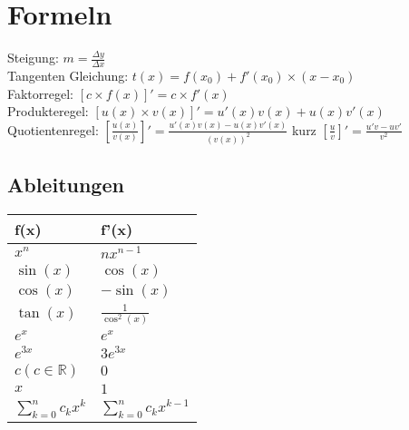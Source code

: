 \documentclass[../main.tex]{subfiles}
\begin{document}
\section{Formeln}
Steigung: $m = \frac{\Delta y}{\Delta x}$ \\ [7pt]
Tangenten Gleichung: $t(x) = f(x_0) + f'(x_0) \times (x - x_0)$ \\ [7pt]
Faktorregel: $[c \times f(x)]' = c \times f'(x)$ \\ [7pt]
Produkteregel: $[u(x) \times v(x)]' = u'(x)v(x) + u(x)v'(x)$ \\ [7pt]
Quotientenregel: $[\frac{u(x)}{v(x)}]' = \frac{u'(x)v(x) - u(x)v'(x)}{(v(x))^2}$ kurz $[\frac{u}{v}]'=\frac{u'v - uv'}{v^2}$

\subsection{Ableitungen}
\begin{tabularx}{0.5\textwidth} { 
    >{\centering\arraybackslash}X 
    >{\centering\arraybackslash}X  }
    \hline
    f(x) & f'(x) \\ [7pt]
    \hline
    $x^n$ & $nx^{n-1}$
    \\ [7pt]
    $\sin(x)$ & $\cos(x)$
    \\ [7pt]
    $\cos(x)$ & $-\sin(x)$
    \\ [7pt]
    $\tan(x)$ & $\frac{1}{\cos^2(x)}$
    \\ [7pt]
    $e^x$ & $e^x$
    \\ [7pt]
    $e^{3x}$ & $3e^{3x}$
    \\ [7pt]
    $c (c \in \mathbb{R})$ & $0$
    \\ [7pt]
    $x$ & $1$
    \\ [7pt]
    $\sum\limits_{k=0}^n c_kx^k$ & $\sum\limits_{k=0}^n c_kx^{k-1}$
\end{tabularx}
\end{document}
